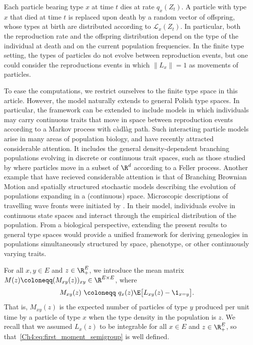 \begin{refsegment}
Each particle bearing type $x$ at time $t$ dies at rate $q_x(Z_t)$. A particle with type $x$ that died at time $t$ is replaced upon death by a random vector of offspring, whose types at birth are distributed according to $\mathscr{L}_x(Z_{t})$. 
In particular, both the reproduction rate and the offspring distribution depend on the type of the individual at death and on the current population frequencies.
In the finite type setting, the types of particles do not evolve between reproduction events, but one could consider the reproductions events in which $\lVert L_{x}\rVert = 1$ as movements of particles.


\begin{rem}
  To ease the computations, we restrict ourselves to the finite type space in this article.
However, the model naturally extends to general Polish type spaces. In particular, the framework can be extended to include models in which individuals may carry continuous traits that move in space between reproduction events according to a Markov process with càdlàg path. Such interacting particle models arise in many areas of population biology, and have recently attracted considerable attention. It includes the general density-dependent branching populations evolving in discrete \citep{Bansaye} or continuous trait spaces, such as those studied by \cite{medous_spinal_2024} where particles move in a subset of $\R^d$ according to a Feller process.
Another example that have recieved considerable attention is that of Branching Brownian Motion and spatially structured stochastic models describing the evolution of populations expanding in a (continuous) space. Microscopic descriptions of travelling wave fronts were initiated by \cite{brunet_shift_1997}. In their model, individuals evolve in continuous state spaces and interact through the empirical distribution of the population.
From a biological perspective, extending the present results to general type spaces would provide a unified framework for deriving genealogies in populations simultaneously structured by space, phenotype, or other continuously varying traits.
\end{rem}

For all $x,y\in E$ and $z\in\R_+^E$, we introduce the mean matrix $M(z)\coloneqq (M_{xy}(z))_{xy}\in \R^{E\times E}$, where 
\begin{equation}\label{Ch4:eq:first_moment_semigroup}
  M_{xy}(z)\ \coloneqq\ q_x(z)\E\big[L_{xy}(z)-\1_{x=y}\big].
\end{equation}
That is, $M_{xy}(z)$ is the expected number of particles of type $y$ produced per unit time by a particle of type $x$ when the type density in the population is $z$. We recall that we assumed $L_x(z)$ to be integrable for all $x\in E$ and $z\in\R_+^E$, so that~\eqref{Ch4:eq:first_moment_semigroup} is well defined.


\end{refsegment}
